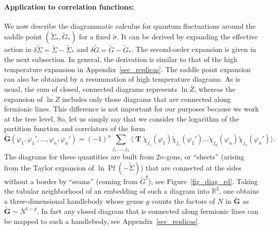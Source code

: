 \documentclass[12pt]{article}
\newcommand*{\V}[1]{\boldsymbol{#1}}
\newcommand{\blangle}{\bigl\langle}
\newcommand{\brangle}{\bigr\rangle}
\newcommand*{\bcorr}[1]{\blangle{#1}\brangle}
\DeclareMathOperator{\Pf}{Pf}
\DeclareMathOperator{\TT}{\mathbf{T}}
\newcommand{\tG}{\widetilde{G}}
\newcommand{\tSig}{\widetilde{\Sigma}}
\newcommand{\tsig}{\tilde{\sigma}}
\newcommand{\vp}{\varphi}
\begin{document}
\paragraph{Application to correlation functions:}
We now describe the diagrammatic calculus for quantum fluctuations around the saddle point $(\tSig_*,\tG_*)$ for a fixed $\tsig$. It can be derived by expanding the effective action in $\delta\tSig=\tSig-\tSig_*$ and $\delta \tG=\tG-\tG_*$. The second-order expansion is given in the next subsection. In general, the derivation is similar to that of the high temperature expansion in Appendix~\ref{sec_replicas}. The saddle point expansion can also be obtained by a resummation of high temperature diagrams. As is usual, the sum of closed, connected diagrams represents $\ln\overline{Z}$, whereas the expansion of $\overline{\ln Z}$ includes only those diagrams that are connected along fermionic lines. This difference is not important for our purposes because we work at the tree level. So, let us simply say that we consider the logarithm of the partition function and correlators of the form
\begin{equation}\label{2nfunc}
\widetilde{\V{G}}(\vp_{1},\vp_{1}',\dots,\vp_{n},\vp_{n}')
=(-1)^n\sum_{j_1,\dots,j_n}
\bcorr{\TT\widetilde{\chi}_{j_1}(\vp_{1})\widetilde{\chi}_{j_1}(\vp_{1}')
\dots \widetilde{\chi}_{j_n}(\vp_{n})\widetilde{\chi}_{j_n}(\vp_{n}')}.
\end{equation}
The diagrams for these quantities are built from $2n$-gons, or ``sheets'' (arising from the Taylor expansion of $\ln\Pf(-\tSig)$) that are connected at the sides without a border by ``seams'' (coming from $\tG^q$), see Figure~\ref{fig_diag_rd}. Taking the tubular neighborhood of an embedding of such a diagram into $\mathbb{R}^3$, one obtains a three-dimensional handlebody whose genus $g$ counts the factors of $N$ in $\widetilde{\V{G}}$ as $\widetilde{\V{G}} \sim N^{1-g}$. In fact any closed diagram
that is connected along fermionic lines can be mapped to such a handlebody, see Appendix~\ref{sec_replicas}.
\end{document}
